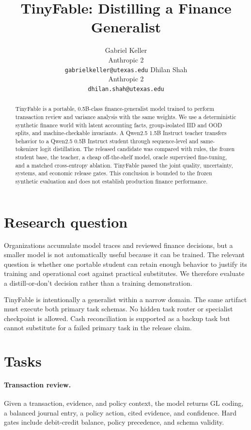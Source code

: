 \documentclass{article}
\title{TinyFable: Distilling a Finance Generalist}
\author{
Gabriel Keller \\
Anthropic 2 \\
\texttt{gabrielkeller@utexas.edu}
\And
Dhilan Shah \\
Anthropic 2 \\
\texttt{dhilan.shah@utexas.edu}
}
\begin{document}
\maketitle

\begin{abstract}
TinyFable is a portable, 0.5B-class finance-generalist model trained to perform transaction review and variance analysis with the same weights. We use a deterministic synthetic finance world with latent accounting facts, group-isolated IID and OOD splits, and machine-checkable invariants. A Qwen2.5 1.5B Instruct teacher transfers behavior to a Qwen2.5 0.5B Instruct student through sequence-level and same-tokenizer logit distillation. The released candidate was compared with rules, the frozen student base, the teacher, a cheap off-the-shelf model, oracle supervised fine-tuning, and a matched cross-entropy ablation. TinyFable passed the joint quality, uncertainty, systems, and economic release gates. This conclusion is bounded to the frozen synthetic evaluation and does not establish production finance performance.
\end{abstract}

\section{Research question}
Organizations accumulate model traces and reviewed finance decisions, but a smaller model is not automatically useful because it can be trained. The relevant question is whether one portable student can retain enough behavior to justify its training and operational cost against practical substitutes. We therefore evaluate a distill-or-don't decision rather than a training demonstration.

TinyFable is intentionally a generalist within a narrow domain. The same artifact must execute both primary task schemas. No hidden task router or specialist checkpoint is allowed. Cash reconciliation is supported as a backup task but cannot substitute for a failed primary task in the release claim.

\section{Tasks}
\paragraph{Transaction review.} Given a transaction, evidence, and policy context, the model returns GL coding, a balanced journal entry, a policy action, cited evidence, and confidence. Hard gates include debit-credit balance, policy precedence, and schema validity.
\end{document}
